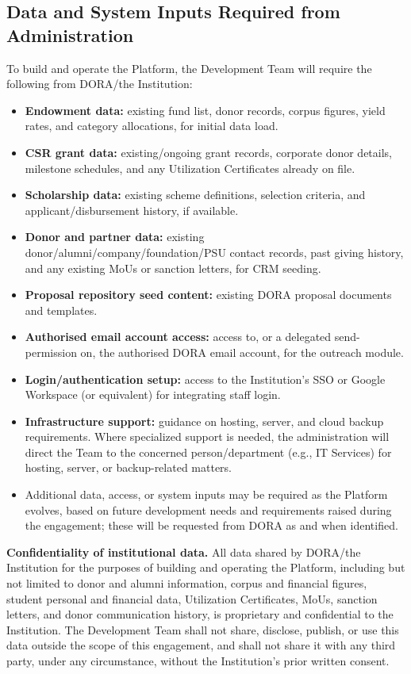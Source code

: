 \documentclass[11pt]{article}
\begin{document}
\subsection{Data and System Inputs Required from Administration}
To build and operate the Platform, the Development Team will require the following from DORA/the Institution:
\begin{itemize}[leftmargin=1.4em, itemsep=3pt]
\item \textbf{Endowment data:} existing fund list, donor records, corpus figures, yield rates, and category allocations, for initial data load.
\item \textbf{CSR grant data:} existing/ongoing grant records, corporate donor details, milestone schedules, and any Utilization Certificates already on file.
\item \textbf{Scholarship data:} existing scheme definitions, selection criteria, and applicant/disbursement history, if available.
\item \textbf{Donor and partner data:} existing donor/alumni/company/foundation/PSU contact records, past giving history, and any existing MoUs or sanction letters, for CRM seeding.
\item \textbf{Proposal repository seed content:} existing DORA proposal documents and templates.
\item \textbf{Authorised email account access:} access to, or a delegated send-permission on, the authorised DORA email account, for the outreach module.
\item \textbf{Login/authentication setup:} access to the Institution's SSO or Google Workspace (or equivalent) for integrating staff login.
\item \textbf{Infrastructure support:} guidance on hosting, server, and cloud backup requirements. Where specialized support is needed, the administration will direct the Team to the concerned person/department (e.g., IT Services) for hosting, server, or backup-related matters.
\item Additional data, access, or system inputs may be required as the Platform evolves, based on future development needs and requirements raised during the engagement; these will be requested from DORA as and when identified.
\end{itemize}

\textbf{Confidentiality of institutional data.} All data shared by DORA/the Institution for the purposes of building and operating the Platform, including but not limited to donor and alumni information, corpus and financial figures, student personal and financial data, Utilization Certificates, MoUs, sanction letters, and donor communication history, is proprietary and confidential to the Institution. The Development Team shall not share, disclose, publish, or use this data outside the scope of this engagement, and shall not share it with any third party, under any circumstance, without the Institution's prior written consent.
\end{document}
